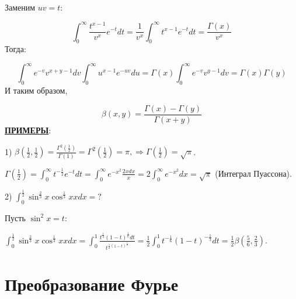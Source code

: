 \documentclass[12pt]{article}
\begin{document}
Заменим $uv = t$:\par
$$\int_0^\infty \frac{t^{x-1}}{v^{x}} e^{-t} dt = \frac{1}{v^x} \int_0^\infty t^{x-1} e^{-t} dt = \frac{\Gamma(x)}{v^x}$$
Тогда:\par
$$\int_0^\infty e^{-v} v^{x+y-1} dv \int_0^\infty u^{x-1} e^{-uv} du = \Gamma(x) \int_0^\infty e^{-v} v^{y-1} dv = \Gamma(x) \Gamma(y)$$
И таким образом,\par
$$\beta(x,y) = \frac{\Gamma(x) - \Gamma(y)}{\Gamma(x+y)}$$
\uline{\textbf{ПРИМЕРЫ}}:\par
1) $\beta(\frac{1}{2}, \frac{1}{2}) = \frac{\Gamma^2(\frac{1}{2})}{\Gamma(1)} = \Gamma^2(\frac{1}{2}) = \pi, \Rightarrow \Gamma(\frac{1}{2}) = \sqrt{\pi}$.\par
$\Gamma(\frac{1}{2}) = \int_0^\infty t^{-\frac{1}{2}} e^{-t} dt = \int_0^\infty e^{-x^2} \frac{2x dx}{x} = 2\int_0^\infty e^{-x^2} dx = \sqrt{\pi}$ (Интеграл Пуассона).\par
2) $\int_0^{\frac{1}{2}} \sin^{\frac{2}{3}}{x} \cos^{\frac{1}{3}}{x} x dx = ?$\par
Пусть $\sin^2{x} = t$:\par
$\int_0^{\frac{1}{2}} \sin^{\frac{2}{3}}{x} \cos^{\frac{1}{3}}{x} x dx = \int_0^1 \frac{t^{\frac{1}{3}} (1-t)^{\frac{1}{6}}dt}{t^{\frac{1}{2} (1-t)^{\frac{1}{2}}}} = \frac{1}{2} \int_0^1 t^{-\frac{1}{6}} (1-t)^{-\frac{1}{3}} dt = \frac{1}{2} \beta(\frac{5}{6}, \frac{2}{3})$.\par
\section{Преобразование Фурье}
\end{document}
